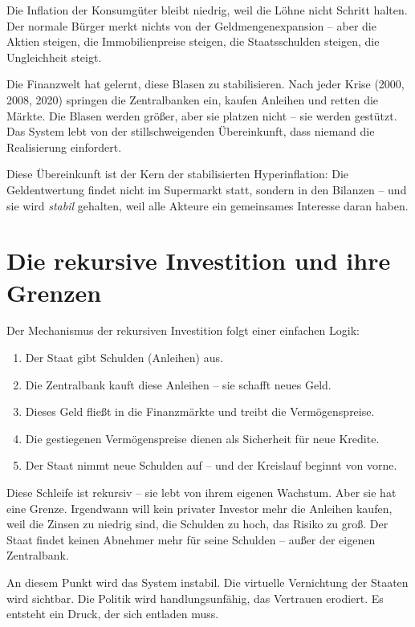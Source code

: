 \documentclass[12pt,a4paper]{book}
\begin{document}
Die Inflation der Konsumgüter bleibt niedrig, weil die Löhne nicht Schritt halten. Der normale Bürger merkt nichts von der Geldmengenexpansion – aber die Aktien steigen, die Immobilienpreise steigen, die Staatsschulden steigen, die Ungleichheit steigt.

Die Finanzwelt hat gelernt, diese Blasen zu stabilisieren. Nach jeder Krise (2000, 2008, 2020) springen die Zentralbanken ein, kaufen Anleihen und retten die Märkte. Die Blasen werden größer, aber sie platzen nicht – sie werden gestützt. Das System lebt von der stillschweigenden Übereinkunft, dass niemand die Realisierung einfordert.

Diese Übereinkunft ist der Kern der stabilisierten Hyperinflation: Die Geldentwertung findet nicht im Supermarkt statt, sondern in den Bilanzen – und sie wird \emph{stabil} gehalten, weil alle Akteure ein gemeinsames Interesse daran haben.

\chapter{Die rekursive Investition und ihre Grenzen}

Der Mechanismus der rekursiven Investition folgt einer einfachen Logik:

\begin{enumerate}
    \item Der Staat gibt Schulden (Anleihen) aus.
    \item Die Zentralbank kauft diese Anleihen – sie schafft neues Geld.
    \item Dieses Geld fließt in die Finanzmärkte und treibt die Vermögenspreise.
    \item Die gestiegenen Vermögenspreise dienen als Sicherheit für neue Kredite.
    \item Der Staat nimmt neue Schulden auf – und der Kreislauf beginnt von vorne.
\end{enumerate}

Diese Schleife ist rekursiv – sie lebt von ihrem eigenen Wachstum. Aber sie hat eine Grenze. Irgendwann will kein privater Investor mehr die Anleihen kaufen, weil die Zinsen zu niedrig sind, die Schulden zu hoch, das Risiko zu groß. Der Staat findet keinen Abnehmer mehr für seine Schulden – außer der eigenen Zentralbank.

An diesem Punkt wird das System instabil. Die virtuelle Vernichtung der Staaten wird sichtbar. Die Politik wird handlungsunfähig, das Vertrauen erodiert. Es entsteht ein Druck, der sich entladen muss.
\end{document}
